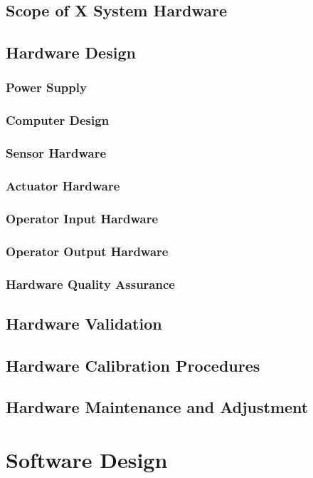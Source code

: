 \documentclass[10pt,a4paper]{report}
\begin{document}
\section{Scope of X System Hardware}

\section{Hardware Design}
\subsection{Power Supply}
\subsection{Computer Design}
\subsection{Sensor Hardware}
\subsection{Actuator Hardware}
\subsection{Operator Input Hardware}
\subsection{Operator Output Hardware}
\subsection{Hardware Quality Assurance}

\section{Hardware Validation}

\section{Hardware Calibration Procedures}

\section{Hardware Maintenance and Adjustment}

\chapter{Software Design}
\end{document}

